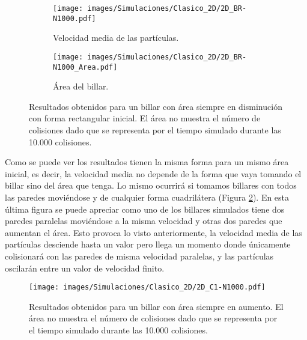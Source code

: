 \begin{figure}[h]
    \begin{subfigure}[b]{0.5\textwidth}
        \centering
        \texttt{[image: images/Simulaciones/Clasico\_2D/2D\_BR-N1000.pdf]}
        \caption{Velocidad media de las partículas.}
    \end{subfigure}
    \hfill
    \begin{subfigure}[b]{0.5\textwidth}
        \centering
        \texttt{[image: images/Simulaciones/Clasico\_2D/2D\_BR-N1000\_Area.pdf]}
        \caption{Área del billar.}
    \end{subfigure}
    \caption{Resultados obtenidos para un billar con área siempre en disminución con forma rectangular inicial. El área no muestra el número de colisiones dado que se representa por el tiempo simulado durante las 10.000 colisiones.}
    \label{fig:2D_BR-N1000_con_Area}
\end{figure}

Como se puede ver los resultados tienen la misma forma para un mismo área inicial, es decir, la velocidad media no depende de la forma que vaya tomando el billar sino del área que tenga. Lo mismo ocurrirá si tomamos billares con todos las paredes moviéndose y de cualquier forma cuadrilátera (Figura \ref{fig:2D_C-N1000}). En esta última figura se puede apreciar como uno de los billares simulados tiene dos paredes paralelas moviéndose a la misma velocidad y otras dos paredes que aumentan el área. Esto provoca lo visto anteriormente, la velocidad media de las partículas desciende hasta un valor pero llega un momento donde únicamente colisionará con las paredes de misma velocidad paralelas, y las partículas oscilarán entre un valor de velocidad finito. 

\begin{figure}[H]
    \centering
    \texttt{[image: images/Simulaciones/Clasico\_2D/2D\_C1-N1000.pdf]}
    \caption{Resultados obtenidos para un billar con área siempre en aumento. El área no muestra el número de colisiones dado que se representa por el tiempo simulado durante las 10.000 colisiones.}
    \label{fig:2D_C-N1000}
\end{figure}

